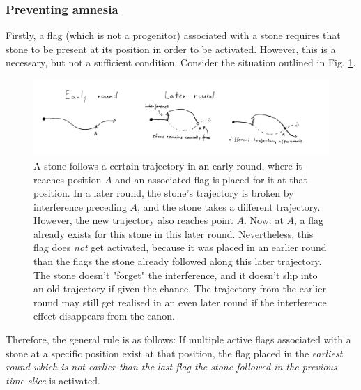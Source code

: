 \documentclass[12pt]{article}
\begin{document}
	
	\subsubsection{Preventing amnesia}\label{sec:flag activation conditions}
	Firstly, a flag (which is not a progenitor) associated with a stone requires that stone to be present at its position in order to be activated. However, this is a necessary, but not a sufficient condition. Consider the situation outlined in Fig. \ref{fig:amnesia}.
	
\begin{figure}[h]
\begin{center}
    \includegraphics[width=1\textwidth]{images/diag_amnesia}
 \caption{A stone follows a certain trajectory in an early round, where it reaches position $A$ and an associated flag is placed for it at that position. In a later round, the stone's trajectory is broken by interference preceding $A$, and the stone takes a different trajectory. However, the new trajectory also reaches point $A$. Now: at $A$, a flag already exists for this stone in this later round. Nevertheless, this flag does \textit{not} get activated, because it was placed in an earlier round than the flags the stone already followed along this later trajectory. The stone doesn't "forget" the interference, and it doesn't slip into an old trajectory if given the chance. The trajectory from the earlier round may still get realised in an even later round if the interference effect disappears from the canon.}\label{fig:amnesia}
\end{center}
\end{figure}
	
	
	Therefore, the general rule is as follows: If multiple active flags associated with a stone at a specific position exist at that position, the flag placed in the \textit{earliest round which is not earlier than the last flag the stone followed in the previous time-slice} is activated.
	
\end{document}
